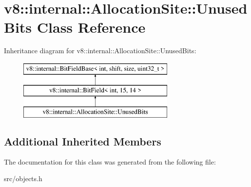 \hypertarget{classv8_1_1internal_1_1_allocation_site_1_1_unused_bits}{}\section{v8\+:\+:internal\+:\+:Allocation\+Site\+:\+:Unused\+Bits Class Reference}
\label{classv8_1_1internal_1_1_allocation_site_1_1_unused_bits}
Inheritance diagram for v8\+:\+:internal\+:\+:Allocation\+Site\+:\+:Unused\+Bits\+:\begin{figure}[H]
\begin{center}
\leavevmode
\includegraphics[height=3.000000cm]{classv8_1_1internal_1_1_allocation_site_1_1_unused_bits}
\end{center}
\end{figure}
\subsection*{Additional Inherited Members}


The documentation for this class was generated from the following file\+:\begin{DoxyCompactItemize}
\item 
src/objects.\+h\end{DoxyCompactItemize}
